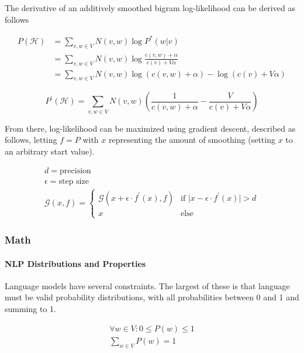 \documentclass[11pt]{article}
\begin{document}
The derivative of an additively smoothed bigram log-likelihood can be derived as follows

\begin{align}
P\left(\mathcal{H}\right) &= \sum\limits_{v, w \in V} N\left(v, w\right) \log P^*\left(w \vert v\right) \\
&= \sum\limits_{v, w \in V} N\left(v, w\right) \log \frac{c\left(v, w\right) + \alpha}{c\left(v\right) + V\alpha} \\
&= \sum\limits_{v, w \in V} N\left(v, w\right) \log\left(c\left(v, w\right) + \alpha\right) - \log\left( c\left(v\right) + V\alpha \right)
\end{align}

$$ P^\prime\left(\mathcal{H}\right) = \sum\limits_{v, w \in V} N\left(v, w\right) \left(\frac{1}{c\left(v, w\right) + \alpha} - \frac{V}{c\left(v\right) + V\alpha }\right) $$

From there, log-likelihood can be maximized using gradient descent, described as follows, letting $f = P$ with $x$ representing the amount of smoothing (setting $x$ to an arbitrary start value).

\begin{gather*}
d = \text{precision} \\
\epsilon = \text{step size} \\
\mathcal{G}\left(x, f \right) =
\begin{cases}
\mathcal{G}\left(x + \epsilon \cdot f^\prime\left(x\right), f \right) & \text{if } \vert x - \epsilon \cdot f^\prime\left(x\right) \vert > d \\
x & \text{else}
\end{cases}
\end{gather*}

\subsubsection{Math}

\paragraph{NLP Distributions and Properties}

Language models have several constraints. The largest of these is that language must be valid probability distributions, with all probabilities between 0 and 1 and summing to 1.

\setcounter{equation}{0}

\begin{gather}
\forall w \in V : 0 \leq P\left(w\right) \leq 1 \\
\sum\limits_{w \in V} P\left(w\right) = 1
\end{gather}
\end{document}
